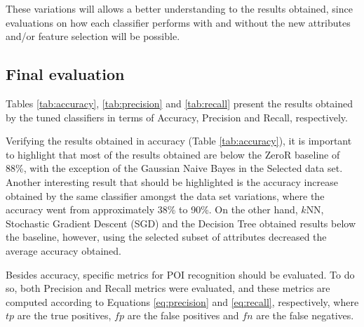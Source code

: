\documentclass[11pt]{article}
\begin{document}
		These variations will allows a better understanding to the results obtained, since evaluations on how each classifier performs with and without the new attributes and/or feature selection will be possible.


	\subsection{Final evaluation}

		
		Tables \ref{tab:accuracy}, \ref{tab:precision} and \ref{tab:recall} present the results obtained by the tuned classifiers in terms of Accuracy, Precision and Recall, respectively.

	\begin{table*}[!t]
		\centering
		\caption{Average accuracy (\%) obtained in the test script.}
		\label{tab:accuracy}
	\end{table*}
	
		Verifying the results obtained in accuracy (Table \ref{tab:accuracy}), it is important to highlight that most of the results obtained are below the ZeroR baseline of 88\%, with the exception of the Gaussian Naive Bayes in the Selected data set.
		Another interesting result that should be highlighted is the accuracy increase obtained by the same classifier amongst the data set variations, where the accuracy went from approximately 38\% to 90\%.
		On the other hand, $k$NN, Stochastic Gradient Descent (SGD) and the Decision Tree obtained results below the baseline, however, using the selected subset of attributes decreased the average accuracy obtained.
	
		Besides accuracy, specific metrics for POI recognition should be evaluated.
		To do so, both Precision and Recall metrics were evaluated, and these metrics are computed according to Equations \ref{eq:precision} and \ref{eq:recall}, respectively, where $tp$ are the true positives, $fp$ are the false positives and $fn$ are the false negatives.
		
\end{document}
